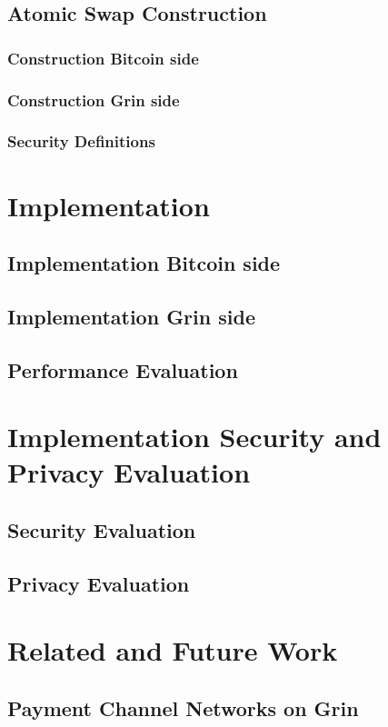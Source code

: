 \documentclass[draft,final]{vutinfth} %
\begin{document}
\section{Atomic Swap Construction}
\subsection{Construction Bitcoin side}
\subsection{Construction Grin side}
\subsection{Security Definitions}

\chapter{Implementation}
\section{Implementation Bitcoin side}
\section{Implementation Grin side}
\section{Performance Evaluation}

\chapter{Implementation Security and Privacy Evaluation}
\section{Security Evaluation}
\section{Privacy Evaluation}

\chapter{Related and Future Work}
\section{Payment Channel Networks on Grin}
\end{document}
